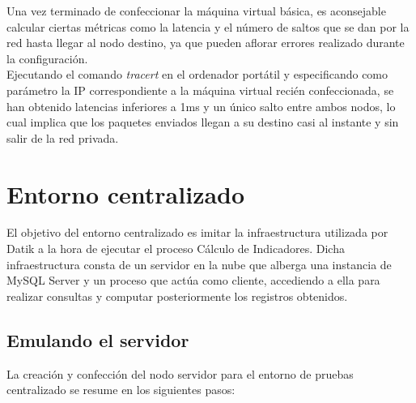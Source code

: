 Una vez terminado de confeccionar la máquina virtual básica, es aconsejable calcular ciertas métricas como la latencia y el número de saltos que se dan por la red hasta llegar al nodo destino, ya que pueden aflorar errores realizado durante la configuración.\\ 

Ejecutando el comando \textit{tracert} en el ordenador portátil y especificando como parámetro la IP correspondiente a la máquina virtual recién confeccionada, se han obtenido latencias inferiores a 1ms y un único salto entre ambos nodos, lo cual implica que los paquetes enviados llegan a su destino casi al instante y sin salir de la red privada.\\

\section{Entorno centralizado}

El objetivo del entorno centralizado es imitar la infraestructura utilizada por Datik a la hora de ejecutar el proceso Cálculo de Indicadores. Dicha infraestructura consta de un servidor en la nube que alberga una instancia de MySQL Server y un proceso que actúa como cliente, accediendo a ella para realizar consultas y computar posteriormente los registros obtenidos.\\

\subsection{Emulando el servidor}

La creación y confección del nodo servidor para el entorno de pruebas centralizado se resume en los siguientes pasos:\\

